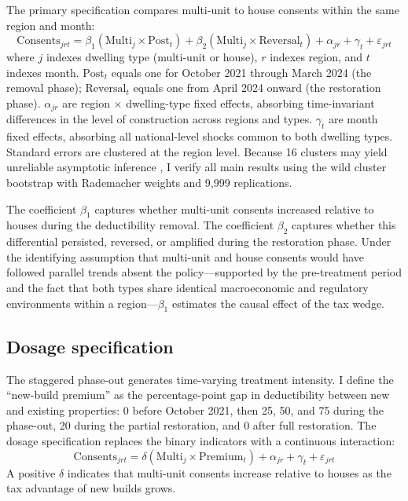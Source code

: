 \documentclass[12pt]{article}
\begin{document}
The primary specification compares multi-unit to house consents within the same region and month:
\begin{equation}
\text{Consents}_{jrt} = \beta_1 (\text{Multi}_j \times \text{Post}_t) + \beta_2 (\text{Multi}_j \times \text{Reversal}_t) + \alpha_{jr} + \gamma_t + \varepsilon_{jrt}
\label{eq:did}
\end{equation}
where $j$ indexes dwelling type (multi-unit or house), $r$ indexes region, and $t$ indexes month. $\text{Post}_t$ equals one for October 2021 through March 2024 (the removal phase); $\text{Reversal}_t$ equals one from April 2024 onward (the restoration phase). $\alpha_{jr}$ are region $\times$ dwelling-type fixed effects, absorbing time-invariant differences in the level of construction across regions and types. $\gamma_t$ are month fixed effects, absorbing all national-level shocks common to both dwelling types. Standard errors are clustered at the region level. Because 16 clusters may yield unreliable asymptotic inference \citep{CameronMiller2015}, I verify all main results using the wild cluster bootstrap with Rademacher weights and 9,999 replications.

The coefficient $\beta_1$ captures whether multi-unit consents increased relative to houses during the deductibility removal. The coefficient $\beta_2$ captures whether this differential persisted, reversed, or amplified during the restoration phase. Under the identifying assumption that multi-unit and house consents would have followed parallel trends absent the policy---supported by the pre-treatment period and the fact that both types share identical macroeconomic and regulatory environments within a region---$\beta_1$ estimates the causal effect of the tax wedge.

\subsection{Dosage specification}

The staggered phase-out generates time-varying treatment intensity. I define the ``new-build premium'' as the percentage-point gap in deductibility between new and existing properties: 0 before October 2021, then 25, 50, and 75 during the phase-out, 20 during the partial restoration, and 0 after full restoration. The dosage specification replaces the binary indicators with a continuous interaction:
\begin{equation}
\text{Consents}_{jrt} = \delta (\text{Multi}_j \times \text{Premium}_t) + \alpha_{jr} + \gamma_t + \varepsilon_{jrt}
\label{eq:dosage}
\end{equation}
A positive $\delta$ indicates that multi-unit consents increase relative to houses as the tax advantage of new builds grows.
\end{document}
